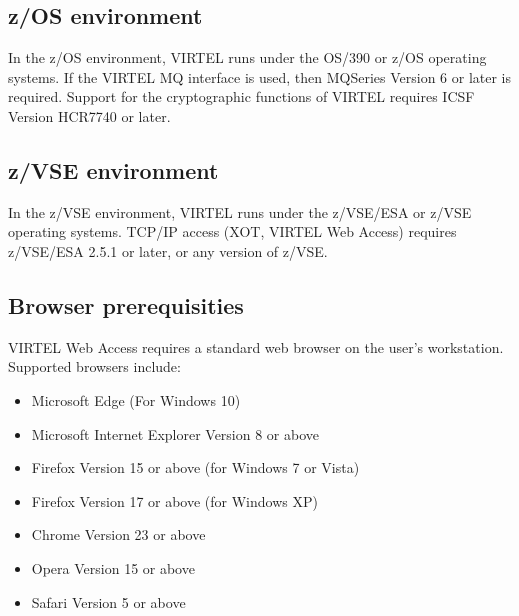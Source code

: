 \documentclass[letterpaper,10pt,english]{sphinxmanual}
\begin{document}
\subsection{z/OS environment}
\label{\detokenize{Installation_Guide:z-os-environment}}
\sphinxAtStartPar
In the z/OS environment, VIRTEL runs under the OS/390 or z/OS operating systems. If the VIRTEL MQ interface is used, then MQSeries Version 6 or later is required. Support for the cryptographic functions of VIRTEL requires ICSF Version HCR7740 or later.


\subsection{z/VSE environment}
\label{\detokenize{Installation_Guide:z-vse-environment}}
\sphinxAtStartPar
In the z/VSE environment, VIRTEL runs under the z/VSE/ESA or z/VSE operating systems. TCP/IP access (XOT, VIRTEL Web Access) requires z/VSE/ESA 2.5.1 or later, or any version of z/VSE.

\ignorespaces 

\subsection{Browser pre\sphinxhyphen{}requisities}
\label{\detokenize{Installation_Guide:browser-pre-requisities}}\label{\detokenize{Installation_Guide:index-1}}
\sphinxAtStartPar
VIRTEL Web Access requires a standard web browser on the user’s workstation. Supported browsers include:
\begin{itemize}
\item {} 
\sphinxAtStartPar
Microsoft Edge (For Windows 10)

\item {} 
\sphinxAtStartPar
Microsoft Internet Explorer Version 8 or above

\item {} 
\sphinxAtStartPar
Firefox Version 15 or above (for Windows 7 or Vista)

\item {} 
\sphinxAtStartPar
Firefox Version 17 or above (for Windows XP)

\item {} 
\sphinxAtStartPar
Chrome Version 23 or above

\item {} 
\sphinxAtStartPar
Opera Version 15 or above

\item {} 
\sphinxAtStartPar
Safari Version 5 or above

\end{itemize}
\end{document}
